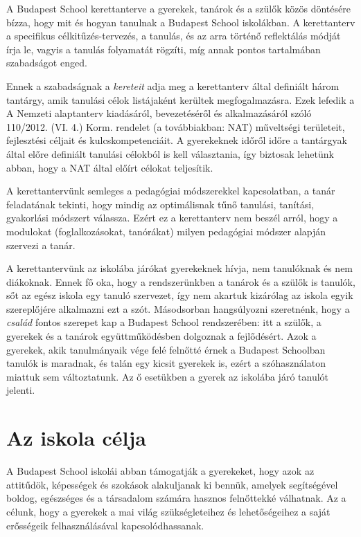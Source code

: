 A Budapest School kerettanterve a gyerekek, tanárok és a szülők közös döntésére bízza, hogy mit és hogyan tanulnak a Budapest School iskolákban. A kerettanterv a specifikus célkitűzés-tervezés, a tanulás, és az arra történő reflektálás módját írja le, vagyis a tanulás folyamatát rögzíti, míg annak pontos tartalmában szabadságot enged.

Ennek a szabadságnak a \emph{kereteit} adja meg a kerettanterv által definiált három tantárgy, amik tanulási célok listájaként kerültek megfogalmazásra. Ezek lefedik a A Nemzeti alaptanterv kiadásáról, bevezetéséről és alkalmazásáról szóló 110/2012. (VI. 4.) Korm. rendelet (a továbbiakban: NAT) műveltségi területeit, fejlesztési céljait és kulcskompetenciáit. A gyerekeknek időről időre a tantárgyak által előre definiált tanulási célokból is kell választania, így biztosak lehetünk abban, hogy a NAT által előírt célokat teljesítik.

A kerettantervünk semleges a pedagógiai módszerekkel kapcsolatban, a tanár feladatának tekinti, hogy mindig az optimálisnak tűnő tanulási, tanítási, gyakorlási módszert válassza. Ezért ez a kerettanterv nem beszél arról, hogy a modulokat (foglalkozásokat, tanórákat) milyen pedagógiai módszer alapján szervezi a tanár.

A kerettantervünk az iskolába járókat gyerekeknek hívja, nem tanulóknak és nem diákoknak. Ennek fő oka, hogy a rendszerünkben a tanárok és a szülők is tanulók, sőt az egész iskola egy tanuló szervezet, így nem akartuk  kizárólag az iskola egyik szereplőjére alkalmazni ezt a szót. Másodsorban hangsúlyozni szeretnénk, hogy a \emph{család} fontos szerepet kap a Budapest School rendszerében: itt a szülők, a gyerekek és a tanárok együttműködésben dolgoznak a fejlődésért. Azok a gyerekek, akik tanulmányaik vége felé felnőtté érnek a Budapest Schoolban tanulók is maradnak, és talán egy kicsit gyerekek is, ezért a szóhasználaton miattuk sem változtatunk. Az ő esetükben a gyerek az iskolába járó tanulót jelenti.

\section{Az iskola célja}

A Budapest School iskolái abban támogatják a gyerekeket, hogy azok az attitűdök, képességek és szokások alakuljanak ki bennük, amelyek segítségével boldog, egészséges és a társadalom számára hasznos felnőttekké válhatnak. Az a célunk, hogy a gyerekek a mai világ szükségleteihez és lehetőségeihez a saját erősségeik felhasználásával kapcsolódhassanak.

